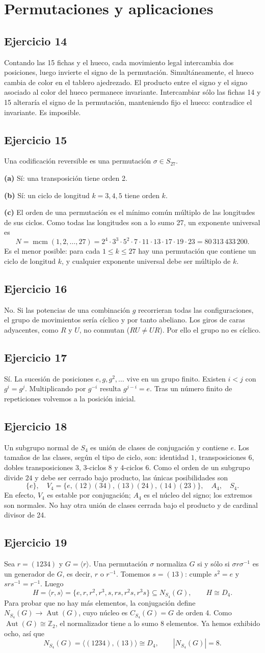\documentclass[11pt,a4paper]{article}
\newcommand{\Z}{\mathbb Z}
\newcommand{\ej}[1]{\subsection*{Ejercicio #1}}
\begin{document}
\section{Permutaciones y aplicaciones}
\ej{14}
Contando las 15 fichas y el hueco, cada movimiento legal intercambia dos posiciones, luego invierte el signo de la permutación. Simultáneamente, el hueco cambia de color en el tablero ajedrezado. El producto entre el signo y el signo asociado al color del hueco permanece invariante. Intercambiar sólo las fichas 14 y 15 alteraría el signo de la permutación, manteniendo fijo el hueco: contradice el invariante. Es imposible.
\ej{15}
Una codificación reversible es una permutación $\sigma\in S_{27}$.

\textbf{(a)} Sí: una transposición tiene orden 2.

\textbf{(b)} Sí: un ciclo de longitud $k=3,4,5$ tiene orden $k$.

\textbf{(c)} El orden de una permutación es el mínimo común múltiplo de las longitudes de sus ciclos. Como todas las longitudes son a lo sumo 27, un exponente universal es
\[N=\operatorname{mcm}(1,2,\ldots,27)=2^4\cdot3^3\cdot5^2\cdot7\cdot11\cdot13\cdot17\cdot19\cdot23=80\,313\,433\,200.\]
Es el menor posible: para cada $1\leq k\leq27$ hay una permutación que contiene un ciclo de longitud $k$, y cualquier exponente universal debe ser múltiplo de $k$.
\ej{16}
No. Si las potencias de una combinación $g$ recorrieran todas las configuraciones, el grupo de movimientos sería cíclico y por tanto abeliano. Los giros de caras adyacentes, como $R$ y $U$, no conmutan ($RU\neq UR$). Por ello el grupo no es cíclico.
\ej{17}
Sí. La sucesión de posiciones $e,g,g^2,\ldots$ vive en un grupo finito. Existen $i<j$ con $g^i=g^j$. Multiplicando por $g^{-i}$ resulta $g^{j-i}=e$. Tras un número finito de repeticiones volvemos a la posición inicial.
\ej{18}
Un subgrupo normal de $S_4$ es unión de clases de conjugación y contiene $e$. Los tamaños de las clases, según el tipo de ciclo, son: identidad $1$, transposiciones $6$, dobles transposiciones $3$, 3-ciclos $8$ y 4-ciclos $6$. Como el orden de un subgrupo divide $24$ y debe ser cerrado bajo producto, las únicas posibilidades son
\[\boxed{\{e\},\quad V_4=\{e,(12)(34),(13)(24),(14)(23)\},\quad A_4,\quad S_4.}\]
En efecto, $V_4$ es estable por conjugación; $A_4$ es el núcleo del signo; los extremos son normales. No hay otra unión de clases cerrada bajo el producto y de cardinal divisor de 24.
\ej{19}
Sea $r=(1234)$ y $G=\langle r\rangle$. Una permutación $\sigma$ normaliza $G$ si y sólo si $\sigma r\sigma^{-1}$ es un generador de $G$, es decir, $r$ o $r^{-1}$. Tomemos $s=(13)$: cumple $s^2=e$ y $srs^{-1}=r^{-1}$. Luego
\[H=\langle r,s\rangle=\{e,r,r^2,r^3,s,rs,r^2s,r^3s\}\subseteq N_{S_4}(G),\qquad H\cong D_4.\]
Para probar que no hay más elementos, la conjugación define $N_{S_4}(G)\to\operatorname{Aut}(G)$, cuyo núcleo es $C_{S_4}(G)=G$ de orden 4. Como $\operatorname{Aut}(G)\cong\Z_2$, el normalizador tiene a lo sumo 8 elementos. Ya hemos exhibido ocho, así que
\[\boxed{N_{S_4}(G)=\langle(1234),(13)\rangle\cong D_4,\qquad |N_{S_4}(G)|=8.}\]
\end{document}

